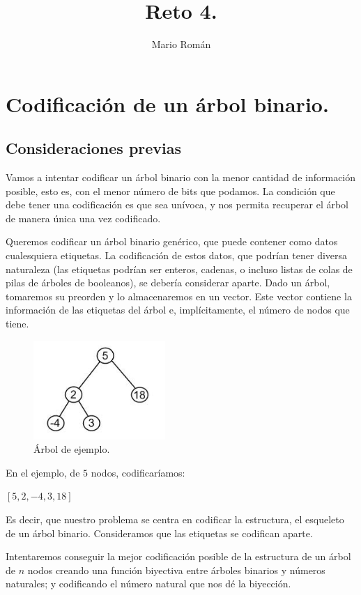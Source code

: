 \documentclass{article}
\title{Reto 4.}
\author{Mario Román}
\begin{document}
\maketitle

\section {Codificación de un árbol binario.}
\subsection {Consideraciones previas}

Vamos a intentar codificar un árbol binario con la menor cantidad de información posible, esto es,
con el menor número de bits que podamos. La condición que debe tener una codificación es que sea unívoca,
y nos permita recuperar el árbol de manera única una vez codificado.

Queremos codificar un árbol binario genérico, que puede contener como datos cualesquiera etiquetas. La codificación
de estos datos, que podrían tener diversa naturaleza (las etiquetas podrían ser enteros, cadenas, o incluso listas de colas de pilas de árboles de booleanos),
se debería considerar aparte. Dado un árbol, tomaremos su preorden y lo almacenaremos en un vector. Este vector contiene la información de las etiquetas del árbol e, 
implícitamente, el número de nodos que tiene.

\begin{figure}[ht!]
\centering
\includegraphics[width=50mm]{ejemplo.jpeg}
\caption{Árbol de ejemplo.}
\label{overflow}
\end{figure}

En el ejemplo, de $5$ nodos, codificaríamos:
\begin{adjustwidth}{2cm}{}
 $[5,2,-4,3,18]$
\end{adjustwidth}
 
Es decir, que nuestro problema se centra en codificar la estructura, el esqueleto de un árbol binario.
Consideramos que las etiquetas se codifican aparte.

Intentaremos conseguir la mejor codificación posible de la estructura de un árbol de $n$ nodos creando una
función biyectiva entre árboles binarios y números naturales; y codificando el número natural que nos dé la biyección.
\end{document}

